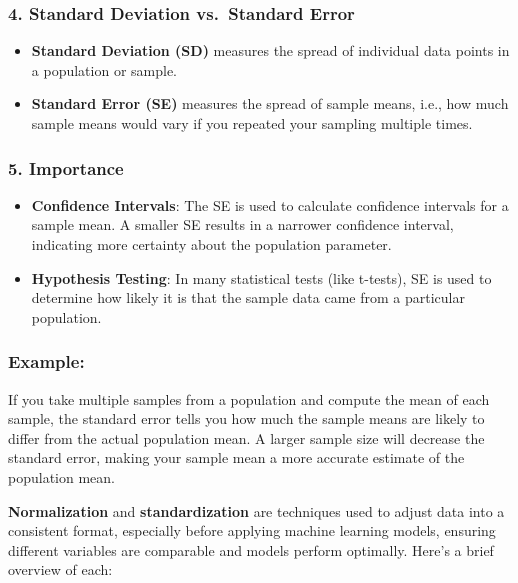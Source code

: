 \documentclass[12pt]{book}
\providecommand{\tightlist}{%
  \setlength{\itemsep}{0pt}\setlength{\parskip}{0pt}}
\begin{document}
\subsubsection{\texorpdfstring{4. \textbf{Standard Deviation
vs.~Standard
Error}}{4. Standard Deviation vs.~Standard Error}}\label{standard-deviation-vs.-standard-error}

\begin{itemize}
\tightlist
\item
  \textbf{Standard Deviation (SD)} measures the spread of individual
  data points in a population or sample.
\item
  \textbf{Standard Error (SE)} measures the spread of sample means,
  i.e., how much sample means would vary if you repeated your sampling
  multiple times.
\end{itemize}

\subsubsection{\texorpdfstring{5.
\textbf{Importance}}{5. Importance}}\label{importance}

\begin{itemize}
\tightlist
\item
  \textbf{Confidence Intervals}: The SE is used to calculate confidence
  intervals for a sample mean. A smaller SE results in a narrower
  confidence interval, indicating more certainty about the population
  parameter.
\item
  \textbf{Hypothesis Testing}: In many statistical tests (like t-tests),
  SE is used to determine how likely it is that the sample data came
  from a particular population.
\end{itemize}

\subsubsection{Example:}\label{example}

If you take multiple samples from a population and compute the mean of
each sample, the standard error tells you how much the sample means are
likely to differ from the actual population mean. A larger sample size
will decrease the standard error, making your sample mean a more
accurate estimate of the population mean.

\textbf{Normalization} and \textbf{standardization} are techniques used
to adjust data into a consistent format, especially before applying
machine learning models, ensuring different variables are comparable and
models perform optimally. Here's a brief overview of each:
\end{document}
